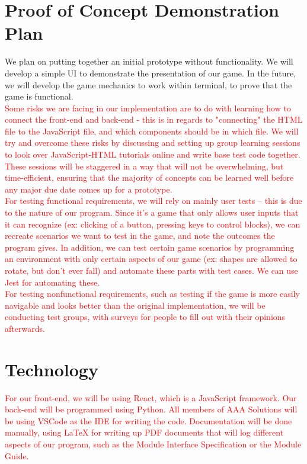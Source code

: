 \documentclass{article}
\begin{document}
\section{Proof of Concept Demonstration Plan}
We plan on putting together an initial prototype without functionality. We will develop a simple UI to demonstrate the presentation of our game. In the future, we will develop the game mechanics to work within terminal, to prove that the game is functional.\\
\textcolor{red}{Some risks we are facing in our implementation are to do with learning how to connect the front-end and back-end - this is in regards to "connecting" the HTML file to the JavaScript file, and which components should be in which file. We will try and overcome these risks by discussing and setting up group learning sessions to look over JavaScript-HTML tutorials online and write base test code together. These sessions will be staggered in a way that will not be overwhelming, but time-efficient, ensuring that the majority of concepts can be learned well before any major due date comes up for a prototype.
\\For testing functional requirements, we will rely on mainly user tests -- this is due to the nature of our program. Since it's a game that only allows user inputs that it can recognize (ex: clicking of a button, pressing keys to control blocks), we can recreate scenarios we want to test in the game, and note the outcomes the program gives. In addition, we can test certain game scenarios by programming an environment with only certain aspects of our game (ex: shapes are allowed to rotate, but don't ever fall) and automate these parts with test cases. We can use Jest for automating these.
\\For testing nonfunctional requirements, such as testing if the game is more easily navigable and looks better than the original implementation, we will be conducting test groups, with surveys for people to fill out with their opinions afterwards.
}

\section{Technology}
\textcolor{red}{For our front-end, we will be using React, which is a JavaScript framework. Our back-end will be programmed using Python. All members of AAA Solutions will be using VSCode as the IDE for writing the code. Documentation will be done manually, using LaTeX for writing up PDF documents that will log different aspects of our program, such as the Module Interface Specification or the Module Guide.}
\end{document}
